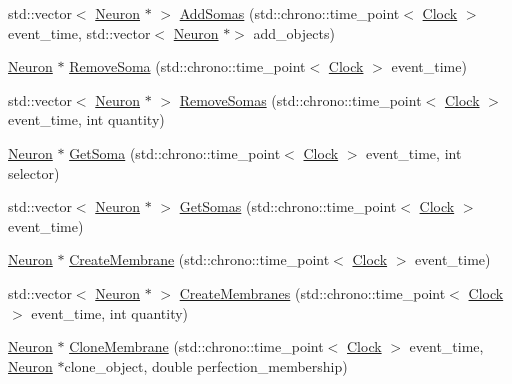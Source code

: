 \begin{DoxyCompactItemize}
\item 
std\+::vector$<$ \hyperlink{class_neuron}{Neuron} $\ast$ $>$ \hyperlink{class_neuron_a78a0f48a669b6ea20280829304e51de2}{Add\+Somas} (std\+::chrono\+::time\+\_\+point$<$ \hyperlink{universe_8h_a0ef8d951d1ca5ab3cfaf7ab4c7a6fd80}{Clock} $>$ event\+\_\+time, std\+::vector$<$ \hyperlink{class_neuron}{Neuron} $\ast$$>$ add\+\_\+objects)
\item 
\hyperlink{class_neuron}{Neuron} $\ast$ \hyperlink{class_neuron_a4f8c2f0c1b294493a7c581a7f46c2863}{Remove\+Soma} (std\+::chrono\+::time\+\_\+point$<$ \hyperlink{universe_8h_a0ef8d951d1ca5ab3cfaf7ab4c7a6fd80}{Clock} $>$ event\+\_\+time)
\item 
std\+::vector$<$ \hyperlink{class_neuron}{Neuron} $\ast$ $>$ \hyperlink{class_neuron_a976b1bab63d0bd21b1c8c8e1cfbd17fe}{Remove\+Somas} (std\+::chrono\+::time\+\_\+point$<$ \hyperlink{universe_8h_a0ef8d951d1ca5ab3cfaf7ab4c7a6fd80}{Clock} $>$ event\+\_\+time, int quantity)
\item 
\hyperlink{class_neuron}{Neuron} $\ast$ \hyperlink{class_neuron_a8539a7965349078a7b1c1265895daefa}{Get\+Soma} (std\+::chrono\+::time\+\_\+point$<$ \hyperlink{universe_8h_a0ef8d951d1ca5ab3cfaf7ab4c7a6fd80}{Clock} $>$ event\+\_\+time, int selector)
\item 
std\+::vector$<$ \hyperlink{class_neuron}{Neuron} $\ast$ $>$ \hyperlink{class_neuron_a867fbd498b54c115a2c8769f83c48020}{Get\+Somas} (std\+::chrono\+::time\+\_\+point$<$ \hyperlink{universe_8h_a0ef8d951d1ca5ab3cfaf7ab4c7a6fd80}{Clock} $>$ event\+\_\+time)
\item 
\hyperlink{class_neuron}{Neuron} $\ast$ \hyperlink{class_neuron_af06efbcc1a96af0290673e9e048267cf}{Create\+Membrane} (std\+::chrono\+::time\+\_\+point$<$ \hyperlink{universe_8h_a0ef8d951d1ca5ab3cfaf7ab4c7a6fd80}{Clock} $>$ event\+\_\+time)
\item 
std\+::vector$<$ \hyperlink{class_neuron}{Neuron} $\ast$ $>$ \hyperlink{class_neuron_a5f6f460c6a98319a05c3ba06d14e6f60}{Create\+Membranes} (std\+::chrono\+::time\+\_\+point$<$ \hyperlink{universe_8h_a0ef8d951d1ca5ab3cfaf7ab4c7a6fd80}{Clock} $>$ event\+\_\+time, int quantity)
\item 
\hyperlink{class_neuron}{Neuron} $\ast$ \hyperlink{class_neuron_ab85f7c42466657095efb3aca5a9ee71d}{Clone\+Membrane} (std\+::chrono\+::time\+\_\+point$<$ \hyperlink{universe_8h_a0ef8d951d1ca5ab3cfaf7ab4c7a6fd80}{Clock} $>$ event\+\_\+time, \hyperlink{class_neuron}{Neuron} $\ast$clone\+\_\+object, double perfection\+\_\+membership)
\item 
$$
\end{DoxyCompactItemize}
